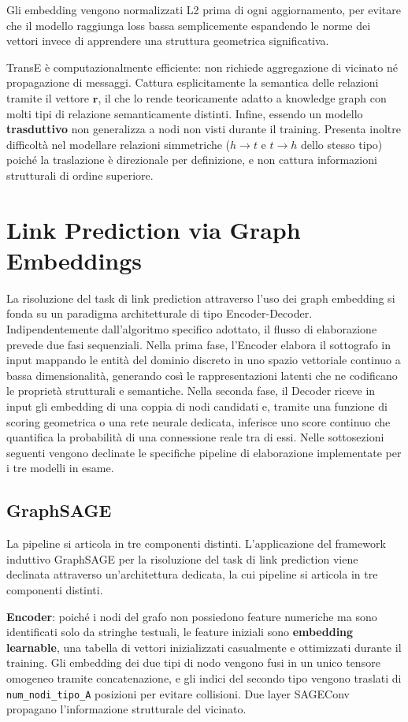 Gli embedding vengono normalizzati L2 prima di ogni aggiornamento, per evitare che il modello raggiunga loss bassa semplicemente espandendo le norme dei vettori invece di apprendere una struttura geometrica significativa.

TransE è computazionalmente efficiente: non richiede aggregazione di vicinato né propagazione di messaggi. Cattura esplicitamente la semantica delle relazioni tramite il vettore $\mathbf{r}$, il che lo rende teoricamente adatto a knowledge graph con molti tipi di relazione semanticamente distinti.
Infine, essendo un modello \textbf{trasduttivo} non generalizza a nodi non visti durante il training. Presenta inoltre difficoltà nel modellare relazioni simmetriche ($h \to t$ e $t \to h$ dello stesso tipo) poiché la traslazione è direzionale per definizione, e non cattura informazioni strutturali di ordine superiore.



\section{Link Prediction via Graph Embeddings}
La risoluzione del task di link prediction attraverso l'uso dei graph embedding si fonda su un paradigma architetturale di tipo Encoder-Decoder. Indipendentemente dall'algoritmo specifico adottato, il flusso di elaborazione prevede due fasi sequenziali. Nella prima fase, l'Encoder elabora il sottografo in input mappando le entità del dominio discreto in uno spazio vettoriale continuo a bassa dimensionalità, generando così le rappresentazioni latenti che ne codificano le proprietà strutturali e semantiche. Nella seconda fase, il Decoder riceve in input gli embedding di una coppia di nodi candidati e, tramite una funzione di scoring geometrica o una rete neurale dedicata, inferisce uno score continuo che quantifica la probabilità di una connessione reale tra di essi. Nelle sottosezioni seguenti vengono declinate le specifiche pipeline di elaborazione implementate per i tre modelli in esame.

\subsection{GraphSAGE} La pipeline si articola in tre componenti distinti.
L'applicazione del framework induttivo GraphSAGE per la risoluzione del task di link prediction viene declinata attraverso un'architettura dedicata, la cui pipeline si articola in tre componenti distinti.

\textbf{Encoder}: poiché i nodi del grafo non possiedono feature numeriche ma sono identificati solo da stringhe testuali, le feature iniziali sono \textbf{embedding learnable}, una tabella di vettori inizializzati casualmente e ottimizzati durante il training. Gli embedding dei due tipi di nodo vengono fusi in un unico tensore omogeneo tramite concatenazione, e gli indici del secondo tipo vengono traslati di \texttt{num\_nodi\_tipo\_A} posizioni per evitare collisioni. Due layer SAGEConv propagano l'informazione strutturale del vicinato.

